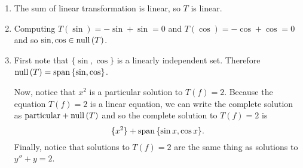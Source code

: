 \begin{enumerate}
\begin{enumerate}
			\item The sum of linear transformation is linear, so $T$ is linear.
			\item Computing $T(\sin) = -\sin+\sin=0$ and $T(\cos) = -\cos+\cos=0$ and so $\sin,\cos\in \mathrm{null}\,(T)$.
			\item First note that $\{\sin,\cos\}$ is a linearly independent set. Therefore $\mathrm{null}\,(T)=\mathrm{span}\,\{\sin,\cos\}$.

			Now, notice that $x^2$ is a particular solution to $T(f)=2$. Because the equation $T(f)=2$ is a linear equation,
			we can write the complete solution as $\text{particular}+\mathrm{null}\,(T)$ and so the complete solution to $T(f)=2$ is
			\[
				\{x^2\}+\mathrm{span}\,\{\sin x,\cos x\}.
			\]
			Finally, notice that solutions to $T(f)=2$ are the same thing as solutions to $y''+y=2$.
		\end{enumerate}
\end{enumerate}
	
